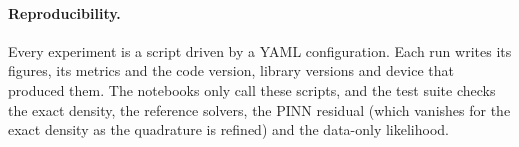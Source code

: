 \paragraph{Reproducibility.} Every experiment is a script driven by a YAML configuration. Each run writes its
figures, its metrics and the code version, library versions and device that produced them. The notebooks only
call these scripts, and the test suite checks the exact density, the reference solvers, the PINN residual
(which vanishes for the exact density as the quadrature is refined) and the data-only likelihood.
